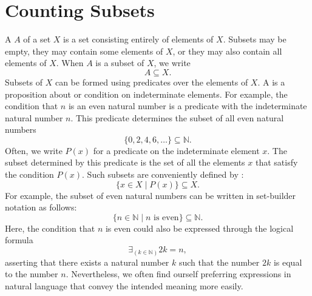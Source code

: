 \section{Counting Subsets}

A  $A$ of a set $X$ is a set consisting entirely of elements of $X$. Subsets may be empty, they may contain some elements of $X$, or they may also contain all elements of $X$. When $A$ is a subset of $X$, we write
\begin{equation*}
  A\subseteq X.
\end{equation*}
Subsets of $X$ can be formed using predicates over the elements of $X$. A  is a proposition about or condition on indeterminate elements. For example, the condition that $n$ is an even natural number is a predicate with the indeterminate natural number $n$. This predicate determines the subset of all even natural numbers
\begin{equation*}
  \{0,2,4,6,\ldots\}\subseteq\mathbb{N}.
\end{equation*}
Often, we write $P(x)$ for a predicate on the indeterminate element $x$. The subset determined by this predicate is the set of all the elements $x$ that satisfy the condition $P(x)$. Such subsets are conveniently defined by :
\begin{equation*}
  \{x\in X\mid P(x)\}\subseteq X.
\end{equation*}
For example, the subset of even natural numbers can be written in set-builder notation as follows:
\begin{equation*}
  \{n\in\mathbb{N}\mid \text{$n$ is even}\}\subseteq\mathbb{N}.
\end{equation*}
Here, the condition that $n$ is even could also be expressed through the logical formula
\begin{equation*}
  \exists_{(k\in\mathbb{N})}2k=n,
\end{equation*}
asserting that there exists a natural number $k$ such that the number $2k$ is equal to the number $n$. Nevertheless, we often find ourself preferring expressions in natural language that convey the intended meaning more easily.


